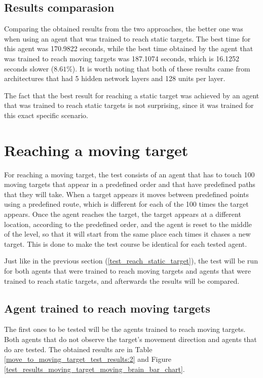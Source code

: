 \subsection{Results comparasion}
Comparing the obtained results from the two approaches, the better one was when using an agent that was trained to reach static targets. The best time for this agent was 170.9822 seconds, while the best time obtained by the agent that was trained to reach moving targets was 187.1074 seconds, which is 16.1252 seconds slower ($8.61\%$). It is worth noting that both of these results came from architectures that had 5 hidden network layers and 128 units per layer.

The fact that the best result for reaching a static target was achieved by an agent that was trained to reach static targets is not surprising, since it was trained for this exact specific scenario.



\section{Reaching a moving target} \label{test_reach_moving_target}

For reaching a moving target, the test consists of an agent that has to touch 100 moving targets that appear in a predefined order and that have predefined paths that they will take. When a target appears it moves between predefined points using a predefined route, which is different for each of the 100 times the target appears. Once the agent reaches the target, the target appears at a different location, according to the predefined order, and the agent is reset to the middle of the level, so that it will start from the same place each times it chases a new target. This is done to make the test course be identical for each tested agent.

Just like in the previous section (\ref{test_reach_static_target}), the test will be run for both agents that were trained to reach moving targets and agents that were trained to reach static targets, and afterwards the results will be compared.


\subsection{Agent trained to reach moving targets}

The first ones to be tested will be the agents trained to reach moving targets. Both agents that do not observe the target's movement direction and agents that do are tested. The obtained results are in Table \ref{move_to_moving_target_test_results:2} and Figure \ref{test_results_moving_target_moving_brain_bar_chart}. 

